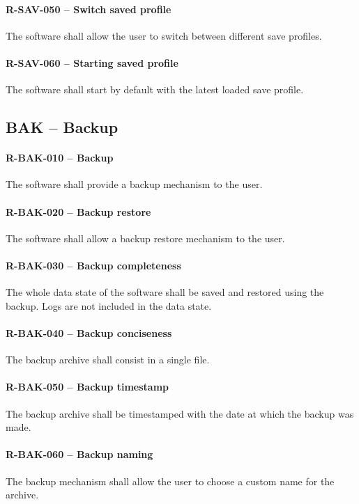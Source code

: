 \paragraph{R-SAV-050 -- Switch saved profile}
The software shall allow the user to switch between different save profiles.

\paragraph{R-SAV-060 -- Starting saved profile}
The software shall start by default with the latest loaded save profile.

\subsection{BAK -- Backup}
\paragraph{R-BAK-010 -- Backup}
The software shall provide a backup mechanism to the user.

\paragraph{R-BAK-020 -- Backup restore}
The software shall allow a backup restore mechanism to the user.

\paragraph{R-BAK-030 -- Backup completeness}
The whole data state of the software shall be saved and restored using the
backup. Logs are not included in the data state.

\paragraph{R-BAK-040 -- Backup conciseness}
The backup archive shall consist in a single file.

\paragraph{R-BAK-050 -- Backup timestamp}
The backup archive shall be timestamped with the date at which the backup was
made.

\paragraph{R-BAK-060 -- Backup naming}
The backup mechanism shall allow the user to choose a custom name for the
archive.

